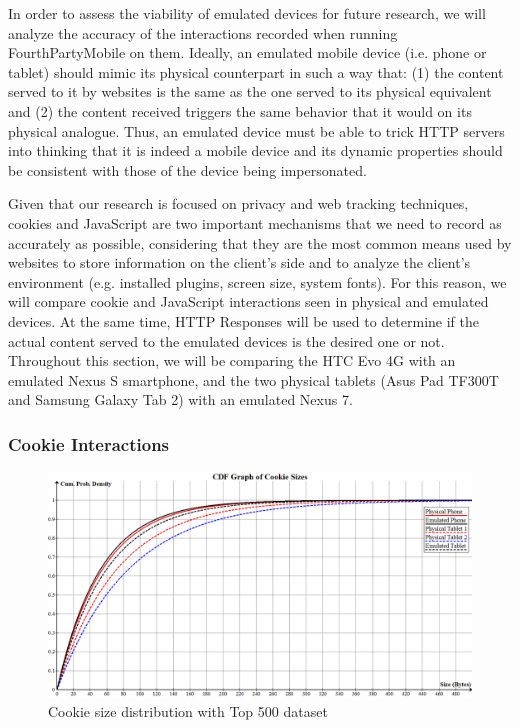 \documentclass{acm_proc_article-sp}
\begin{document}
In order to assess the viability of emulated devices for future research, we will analyze the accuracy of the interactions recorded when running FourthPartyMobile on them. Ideally, an emulated mobile device (i.e. phone or tablet) should mimic its physical counterpart in such a way that: (1) the content served to it by websites is the same as the one served to its physical equivalent and (2) the content received triggers the same behavior that it would on its physical analogue. Thus, an emulated device must be able to trick HTTP servers into thinking that it is indeed a mobile device and its dynamic properties should be consistent with those of the device being impersonated.

Given that our research is focused on privacy and web tracking techniques, cookies and JavaScript are two important mechanisms that we need to record as accurately as possible, considering that they are the most common means used by websites to store information on the client's side and to analyze the client's environment (e.g. installed plugins, screen size, system fonts). For this reason, we will compare cookie and JavaScript interactions seen in physical and emulated devices. At the same time, HTTP Responses will be used to determine if the actual content served to the emulated devices is the desired one or not. Throughout this section, we will be comparing the HTC Evo 4G with an emulated Nexus S smartphone, and the two physical tablets (Asus Pad TF300T and Samsung Galaxy Tab 2) with an emulated Nexus 7.

\subsubsection{Cookie Interactions}


\begin{figure}[ht] 
\centering \includegraphics[scale=0.30]{diagrams/cookies_cdf.png}
\caption{Cookie size distribution with Top 500 dataset}
\label{fig:cookie_cdf}
\end{figure}
\end{document}

